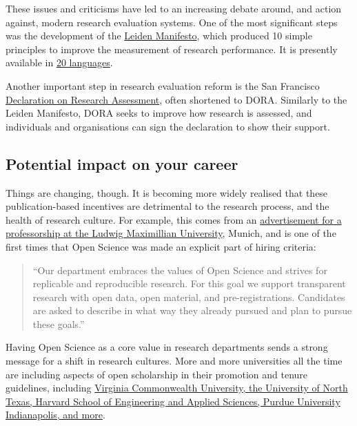 \documentclass[]{book}
\begin{document}
{{{{These issues and criticisms have led to an increasing debate around, and action against, modern research evaluation systems. One of the most significant steps was the development of the \href{http://www.leidenmanifesto.org/}{Leiden Manifesto}, which produced 10 simple principles to improve the measurement of research performance. It is presently available in \href{http://www.leidenmanifesto.org/translations.html}{20 languages}.

Another important step in research evaluation reform is the San Francisco \href{https://sfdora.org/}{Declaration on Research Assessment}, often shortened to DORA. Similarly to the Leiden Manifesto, DORA seeks to improve how research is assessed, and individuals and organisations can sign the declaration to show their support.

\hypertarget{potential-impact-on-your-career}{%
\subsection{Potential impact on your career }\label{potential-impact-on-your-career}}

Things are changing, though. It is becoming more widely realised that these publication-based incentives are detrimental to the research process, and the health of research culture. For example, this comes from an \href{http://www.nicebread.de/open-science-hiring-practices/}{advertisement for a professorship at the Ludwig Maximillian University}, Munich, and is one of the first times that Open Science was made an explicit part of hiring criteria:

\begin{quote}
``Our department embraces the values of Open Science and strives for replicable and reproducible research. For this goal we support transparent research with open data, open material, and pre-registrations. Candidates are asked to describe in what way they already pursued and plan to pursue these goals.''
\end{quote}

Having Open Science as a core value in research departments sends a strong message for a shift in research cultures. More and more universities all the time are including aspects of open scholarship in their promotion and tenure guidelines, including \href{http://whyopenresearch.org/promotion}{Virginia Commonwealth University, the University of North Texas, Harvard School of Engineering and Applied Sciences, Purdue University Indianapolis, and more}.

}}}}
\end{document}
